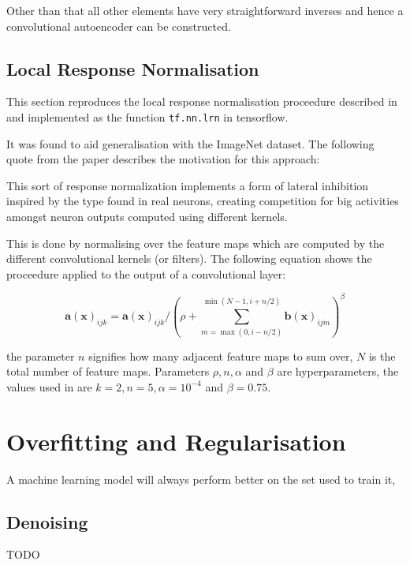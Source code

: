       Other than that all other elements have very straightforward inverses and hence
      a convolutional autoencoder can be constructed.
    \subsection{Local Response Normalisation} \label{sec:lrn}
      This section reproduces the local response normalisation proceedure described in \cite{Krizhevsky2012}
      and implemented as the function \texttt{tf.nn.lrn} in tensorflow.

      It was found to aid generalisation with the ImageNet dataset. The following quote from the paper \cite{Krizhevsky2012}
      describes the motivation for this approach:

      \begin{displayquote}
        This sort of response normalization implements a form of lateral inhibition
        inspired by the type found in real neurons, creating competition for big activities amongst neuron
        outputs computed using different kernels.
      \end{displayquote}

      This is done by normalising over the feature maps which are computed by the different convolutional kernels (or filters).
      The following equation shows the proceedure applied to the output of a convolutional layer:

      \begin{equation} \label{eq:lrn}
        \mathbf{a}(\mathbf{x})_{ijk}
        = \mathbf{a}(\mathbf{x})_{ijk}/\left (\rho + \sum^{\min(N-1,i+n/2)}_{m=\max(0,i-n/2)}\mathbf{b}(\mathbf{x})_{ijm} \right )^\beta
      \end{equation}

      the parameter $n$ signifies how many adjacent feature maps to sum over, $N$ is the total number of feature maps.
      Parameters $\rho,n,\alpha$ and $\beta$ are hyperparameters, the values used in \cite{Krizhevsky2012} are
      $k=2,n=5,\alpha=10^{-4}$ and $\beta=0.75$.

  \section{Overfitting and Regularisation}
    A machine learning model will always perform better on the set used
    to train it, 
    \subsection{Denoising}
      {\color{red} TODO}
